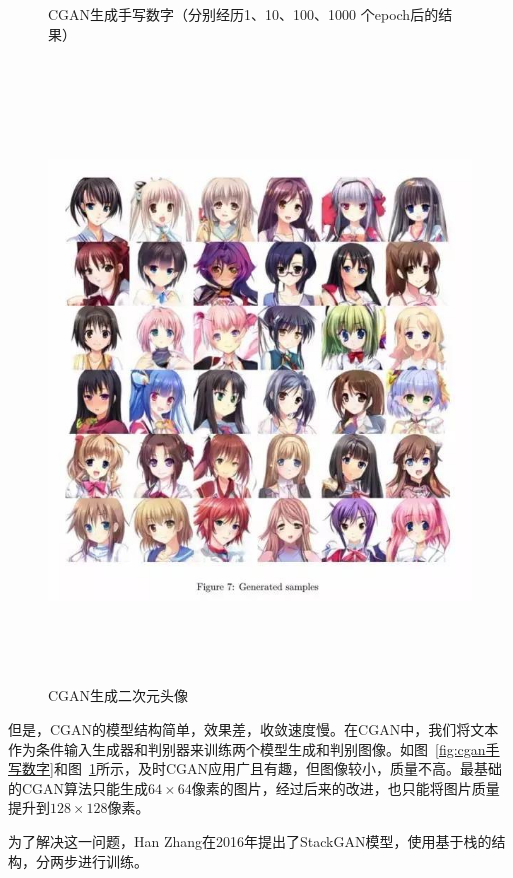 \begin{figure}[htbp]
\begin{minipage}[c]{0.6\textwidth}
\begin{minipage}[c]{0.9\textwidth}
    \end{minipage}
  \caption{CGAN生成手写数字（分别经历1、10、100、1000 个epoch后的结果）} %
  \label{fig:cgan手写数字} 
  \end{minipage}
  \hfill 
  \begin{minipage}[c]{0.3\textwidth} 
  \centering%
  \centerline{\includegraphics[width=1\textwidth]{figures/moegirl.jpg}}
  \caption{CGAN生成二次元头像} 
  \label{fig:萌娘} 
  \end{minipage} 
  \end{figure}

但是，CGAN的模型结构简单，效果差，收敛速度慢。在CGAN中，我们将文本作为条件输入生成器和判别器来训练两个模型生成和判别图像。如图~\ref{fig:cgan手写数字}和图~\ref{fig:萌娘}所示，及时CGAN应用广且有趣，但图像较小，质量不高。最基础的CGAN算法只能生成$64\times64$像素的图片，经过后来的改进，也只能将图片质量提升到$128\times128$像素。

  为了解决这一问题，Han Zhang在2016年提出了StackGAN模型，使用基于栈的结构，分两步进行训练。
  
